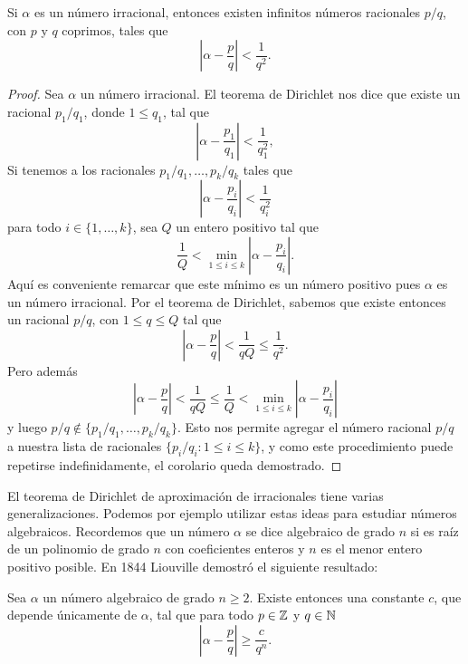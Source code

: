 \begin{corollary}
	Si $\alpha$ es un número irracional, entonces existen infinitos números
	racionales $p/q$, con $p$ y $q$ coprimos, tales que 
	\[
		\left|\alpha-\frac{p}{q}\right|<\frac{1}{q^2}.
	\]
\end{corollary}

\begin{proof}
	Sea $\alpha$ un número irracional.  
	El teorema de Dirichlet nos dice que existe un racional $p_1/q_1$, donde 
	$1\leq q_1$, tal que 
	\[
		\left|\alpha-\frac{p_1}{q_1}\right|<\frac{1}{q_1^2},
	\]
	Si tenemos a los racionales $p_1/q_1,\dots,p_k/q_k$ tales que 
	\[
		\left|\alpha-\frac{p_i}{q_i}\right|<\frac{1}{q_i^2}
	\]
	para todo $i\in\{1,\dots,k\}$, sea $Q$ un entero positivo tal que 
	\[
		\frac{1}{Q}<\min_{1\leq i\leq k}\left|\alpha-\frac{p_i}{q_i}\right|.
	\]
	Aquí es conveniente remarcar que este mínimo es un número positivo pues
	$\alpha$ es un número irracional. Por el teorema de Dirichlet, sabemos que
	existe entonces un racional $p/q$, con $1\leq q\leq Q$ tal que 
	\[
		\left|\alpha-\frac{p}{q}\right|<\frac{1}{qQ}\leq\frac{1}{q^2}.
	\]
	Pero además 
	\[
		\left|\alpha-\frac{p}{q}\right|<\frac{1}{qQ}\leq\frac{1}{Q}<\min_{1\leq i\leq k}\left|\alpha-\frac{p_i}{q_i}\right|
	\]
	y luego $p/q\not\in\{p_1/q_1,\dots,p_k/q_k\}$. Esto nos permite agregar el
	número racional $p/q$ a nuestra lista de racionales $\{p_i/q_i:1\leq i\leq
	k\}$, y como este procedimiento puede repetirse indefinidamente, el
	corolario queda demostrado.
\end{proof}

El teorema de Dirichlet de aproximación de irracionales tiene varias
generalizaciones. Podemos por ejemplo utilizar estas ideas para estudiar
números algebraicos. Recordemos que un número $\alpha$ se dice algebraico de
grado $n$ si es raíz de un polinomio de grado $n$ con coeficientes enteros y
$n$ es el menor entero positivo posible.  En 1844 Liouville demostró el
siguiente resultado:

\begin{theorem}[Liouville]
	Sea $\alpha$ un número algebraico de grado $n\geq2$. Existe entonces una
	constante $c$, que depende únicamente de $\alpha$, tal que para todo
	$p\in\mathbb{Z}$ y $q\in\mathbb{N}$ 
	\[
		\left|\alpha-\frac{p}{q}\right|\geq \frac{c}{q^n}.
	\]
\end{theorem}

